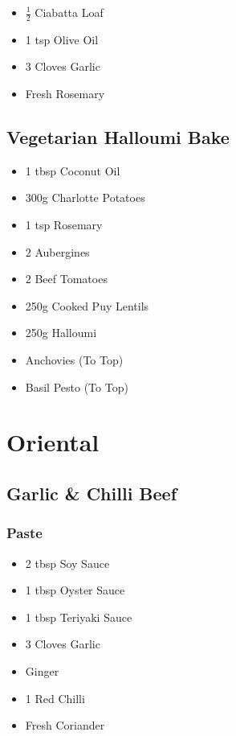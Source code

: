 \documentclass[11pt, english]{article}
\begin{document}
	\begin{itemize}
        \setlength\itemsep{0cm}
		\item $\frac{1}{2}$ Ciabatta Loaf
		\item 1 tsp Olive Oil
		\item 3 Cloves Garlic
		\item Fresh Rosemary
        \end{itemize}

\newpage

	\subsection{Vegetarian Halloumi Bake}

	\begin{itemize}
        \setlength\itemsep{0cm}
                \item 1 tbsp Coconut Oil
		\item 300g Charlotte Potatoes
		\item 1 tsp Rosemary
		\item 2 Aubergines
		\item 2 Beef Tomatoes
		\item 250g Cooked Puy Lentils
		\item 250g Halloumi
		\item Anchovies (To Top)
		\item Basil Pesto (To Top)
        \end{itemize}

\newpage

\section{Oriental}

	\subsection{Garlic \& Chilli Beef}

		\subsubsection*{Paste}

	\begin{itemize}
        \setlength\itemsep{0cm}
                \item 2 tbsp Soy Sauce
		\item 1 tbsp Oyster Sauce
		\item 1 tbsp Teriyaki Sauce
		\item 3 Cloves Garlic
		\item Ginger
		\item 1 Red Chilli
		\item Fresh Coriander 
        \end{itemize}
\end{document}
